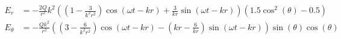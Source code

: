 \documentclass{article}
\begin{document}

\addtocounter{equation}{2}
\begin{align}
    E_r &= - \frac{2 Q}{r^{2}} k^{2} \left(\left(1 - \frac{3}{k^{2} r^{2}}\right) \cos{\left(\omega t - k r \right )} + \frac{3}{k r} \sin{\left (\omega t - k r \right )}\right) \left(1.5 \cos^{2}{\left (\theta \right )} - 0.5\right) \\
  E_\theta &= - \frac{Q k^{2}}{r^{2}} \left(\left(3 - \frac{6}{k^{2} r^{2}}\right) \cos{\left (\omega t - k r \right )} - \left(k r - \frac{6}{k r}\right) \sin{\left (\omega t - k r \right )}\right) \sin{\left (\theta \right )} \cos{\left (\theta \right )}
\end{align}
\end{document}
